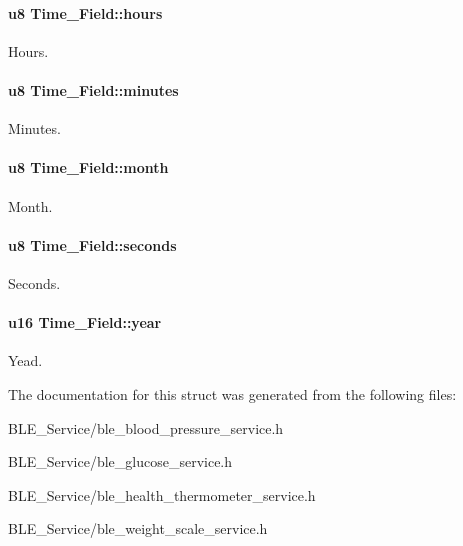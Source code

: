 \paragraph[{\texorpdfstring{hours}{hours}}]{\setlength{\rightskip}{0pt plus 5cm}u8 Time\+\_\+\+Field\+::hours}\hypertarget{struct_time___field_a3bf813f88977f82786b2e42b2d8971bb}{}\label{struct_time___field_a3bf813f88977f82786b2e42b2d8971bb}
Hours. 
\paragraph[{\texorpdfstring{minutes}{minutes}}]{\setlength{\rightskip}{0pt plus 5cm}u8 Time\+\_\+\+Field\+::minutes}\hypertarget{struct_time___field_a96cacf608f484e0df0f0f30d6b0473c9}{}\label{struct_time___field_a96cacf608f484e0df0f0f30d6b0473c9}
Minutes. 
\paragraph[{\texorpdfstring{month}{month}}]{\setlength{\rightskip}{0pt plus 5cm}u8 Time\+\_\+\+Field\+::month}\hypertarget{struct_time___field_aabf7717ef45ee2a386e56d4c0f3cdc34}{}\label{struct_time___field_aabf7717ef45ee2a386e56d4c0f3cdc34}
Month. 
\paragraph[{\texorpdfstring{seconds}{seconds}}]{\setlength{\rightskip}{0pt plus 5cm}u8 Time\+\_\+\+Field\+::seconds}\hypertarget{struct_time___field_aadcdd15bb55775e38af8d8ebfb0fe513}{}\label{struct_time___field_aadcdd15bb55775e38af8d8ebfb0fe513}
Seconds. 
\paragraph[{\texorpdfstring{year}{year}}]{\setlength{\rightskip}{0pt plus 5cm}u16 Time\+\_\+\+Field\+::year}\hypertarget{struct_time___field_ac960412ddea62601d0b51ef08db90706}{}\label{struct_time___field_ac960412ddea62601d0b51ef08db90706}
Yead. 

The documentation for this struct was generated from the following files\+:\begin{DoxyCompactItemize}
\item 
B\+L\+E\+\_\+\+Service/ble\+\_\+blood\+\_\+pressure\+\_\+service.\+h\item 
B\+L\+E\+\_\+\+Service/ble\+\_\+glucose\+\_\+service.\+h\item 
B\+L\+E\+\_\+\+Service/ble\+\_\+health\+\_\+thermometer\+\_\+service.\+h\item 
B\+L\+E\+\_\+\+Service/ble\+\_\+weight\+\_\+scale\+\_\+service.\+h\end{DoxyCompactItemize}

